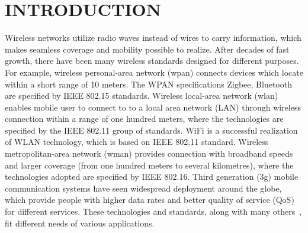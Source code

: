 \chapter{INTRODUCTION}
\label{INTRODUCTION}

Wireless networks utilize radio waves instead of wires to carry information, which makes seamless coverage and mobility possible to realize.
After decades of fast growth, there have been many wireless standards designed for different purposes.
For example, wireless personal-area network (\gls{wpan}) connects devices which locate within a short range of 10 meters.
The WPAN specifications \ie Zigbee, Bluetooth are specified by IEEE 802.15 standards.
Wireless local-area network (\gls{wlan}) enables mobile user to connect to to a local area network (LAN) through wireless connection within a range of one hundred meters, where the technologies are specified by the IEEE 802.11 group of standards.
WiFi is a successful realization of WLAN technology, which is based on IEEE 802.11 standard.
Wireless metropolitan-area network (\gls{wman}) provides connection with broadband speeds and larger coverage (from one hundred meters to several kilometres), where the technologies adopted are specified by IEEE 802.16.
Third generation (\gls{3g}) mobile communication systems have seen widespread deployment around the globe, which provide people with higher data rates and better quality of service (\gls{QoS}) for different services.
These technologies and standards, along with many others~\cite{Molisch:2011:WC:1984860}, fit different needs of various applications.


